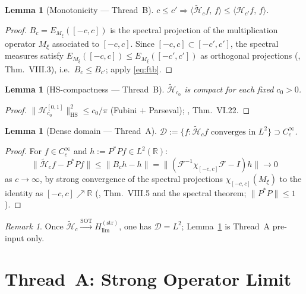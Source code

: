 \documentclass[12pt,a4paper]{amsart}
\newtheorem{lemma}[theorem]{Lemma}
\theoremstyle{definition}
\theoremstyle{remark}
\newtheorem{remark}[theorem]{Remark}
\newcommand{\ip}[2]{\langle #1,\, #2\rangle}
\newcommand{\Hc}{\widetilde{\mathcal{H}}_c}
\newcommand{\Hstrong}{H_{\lim}^{(\mathrm{str})}}
\newcommand{\Fc}{\mathcal{F}}
\newcommand{\Bc}{B_c}
\begin{document}
\begin{lemma}[Monotonicity ---
  Thread~B]
\label{lem:monotone}
$c\le c'\Rightarrow\ip{\Hc f}{f}
\le\ip{\mathcal{H}_{c'}f}{f}$.
\end{lemma}
\begin{proof}
$\Bc = E_{M_\xi}([-c,c])$
is the spectral projection of the
multiplication operator $M_\xi$
associated to $[-c,c]$.
Since $[-c,c]\subset[-c',c']$,
the spectral measures satisfy
$E_{M_\xi}([-c,c])\le
E_{M_\xi}([-c',c'])$
as orthogonal projections
(\cite{ReedSimon1975}, Thm.~VIII.3),
i.e.\ $\Bc\le B_{c'}$;
apply \eqref{eq:ftb}.
\end{proof}

\begin{lemma}[HS-compactness ---
  Thread~B]
\label{lem:hs-compact}
$\widetilde{\mathcal{H}}_{c_0}$
is compact for each fixed $c_0>0$.
\end{lemma}
\begin{proof}
$\|\mathcal{H}_{c_0}^{[0,1]}\|_{\mathrm{HS}}^2
\le c_0/\pi$
(Fubini $+$ Parseval);
\cite{ReedSimon1975}, Thm.~VI.22.
\end{proof}

\begin{lemma}[Dense domain ---
  Thread~A]
\label{lem:dense}
$\mathcal{D}:=\{f:\Hc f\text{ converges}
\text{ in }L^2\}\supset C_c^\infty$.
\end{lemma}
\begin{proof}
For $f\in C_c^\infty$ and
$h:=P^*Pf\in L^2(\mathbb{R})$:
\[
  \|\Hc f - P^*Pf\|
  \le \|\Bc h - h\|
  = \|(\Fc^{-1}\chi_{[-c,c]}\Fc - I)h\|
  \to 0
\]
as $c\to\infty$, by strong convergence
of the spectral projections
$\chi_{[-c,c]}(M_\xi)$ to the identity
as $[-c,c]\nearrow\mathbb{R}$
(\cite{ReedSimon1975}, Thm.~VIII.5
and the spectral theorem;
$\|P^*P\|\le 1$).
\end{proof}

\begin{remark}
\label{rem:dense-trivial}
Once $\Hc\xrightarrow{\mathrm{SOT}}\Hstrong$,
one has $\mathcal{D}=L^2$;
Lemma~\ref{lem:dense} is
Thread~A pre-input only.
\end{remark}

\section{Thread~A: Strong Operator Limit}
\label{sec:strong-limit}
\end{document}
